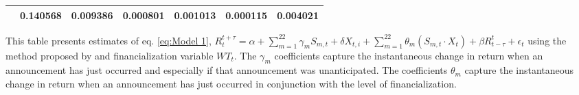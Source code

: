 \begin{sidewaystable}
{\begin{tabular}{@{}lllllllllllll@{}}
&\multicolumn{2}{c}{ 0.140568 }                                                 & \multicolumn{2}{c}{ 0.009386 }                                                 & \multicolumn{2}{c}{ 0.000801 }                                                 & \multicolumn{2}{c}{ 0.001013 }                                                 & \multicolumn{2}{c}{ 0.000115 }                                                   & \multicolumn{2}{c}{ 0.004021 }                                                 \\ \bottomrule 
\end{tabular}
}
\begin{tablenotes}\item 
    \singlespacing
    \footnotesize
    This table presents estimates of eq. \ref{eq:Model 1}, $R_{t}^{t+\tau}=\alpha+\sum_{m=1}^{22} \gamma_m S_{m,t}+ \delta X_{t,i} + \sum_{m=1}^{22} \theta_m (S_{m,t} \cdot X_t)+\beta R_{t-\tau}^{t}+\epsilon_{t}$ using the method proposed by \citet{andersen2007real} and financialization variable $WT_t$. The $\gamma_m$ coefficients capture the instantaneous change in return when an announcement has just occurred and especially if that announcement was unanticipated. The coefficients $\theta_m$ capture the instantaneous change in return when an announcement has just occurred in conjunction with the level of financialization.
\end{tablenotes}
\end{sidewaystable}


